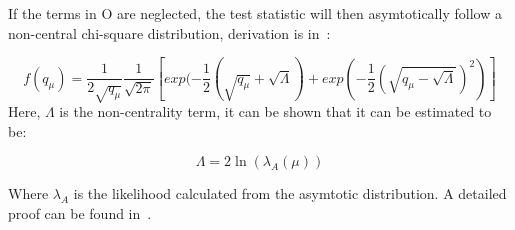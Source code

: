 If the terms in O are neglected, the test statistic will then asymtotically follow a non-central chi-square distribution, derivation is in~\cite{2011}: 

\begin{equation}
    f(q_{\mu}) = \frac{1}{2\sqrt{q_{\mu}}} \frac{1}{\sqrt{2\pi}} [exp(-\frac{1}{2}(\sqrt{q_{\mu}}+ \sqrt{\Lambda})+ exp(-\frac{1}{2}(\sqrt{q_{\mu}-\sqrt{\Lambda}})^{2})]
\end{equation}
Here, $\Lambda$ is the non-centrality term, it can be shown that it can be estimated to be:

\begin{equation}
    \Lambda=2\ln(\lambda_{A}(\mu))
    \label{eq:Lambda}
\end{equation}

Where $\lambda_{A}$ is the likelihood calculated from the asymtotic distribution. A detailed proof can be found in~\cite{2011}. 










%
%
%
%



